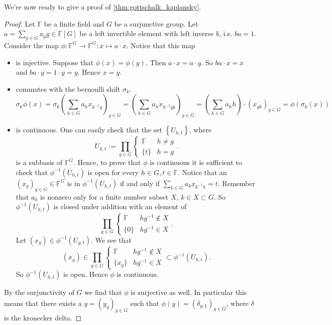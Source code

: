 \documentclass[titlepage, a4paper]{article}
\newcommand{\F}{\mathbb{F}}
\theoremstyle{remark}
\begin{document}
	We're now ready to give a proof of \cref{thm:gottschalk_kaplansky}.
	\begin{proof}
		Let $\F$ be a finite field and $G$ be a surjunctive group. 
		Let $a = \sum_{g \in G} a_g g \in \F[G]$ be a left invertible element with left inverse $b$, i.e.  $b a = 1$. 
		Consider the map $\phi: \F^{G} \to \F^{G}: x \mapsto a\cdot x$. Notice that this map 
		\begin{itemize}
			\item is injective. Suppose that $\phi(x) = \phi(y)$. Then $a\cdot x = a\cdot y$. So $ba\cdot x  = x$ and $ba \cdot y = 1\cdot y = y$. Hence $x = y$.
			\item commutes with the bernoulli shift  $\sigma_k$. 
				 \[
					 \sigma_k \phi(x) 
					 = \sigma_k\left( \sum_{h \in G} a_h x_{h^{-1}g} \right)_{g \in G} 
					 = \left( \sum_{h \in G} a_h x_{h^{-1}gk} \right)_{g \in G} 
					 = \left( \sum_{h \in G}a_h h \right) \cdot (x_{gk})_{g \in G} = \phi(\sigma_k(x)) 
				\]
			\item is continuous. 
			One can easily check that the set $\left\{ U_{h, t} \right\}$, where \[
			U_{h,t}:= \prod_{g \in G} \begin{cases}
				\F & h \ne g\\
				\{t\}& h = g
			\end{cases}
			.\] 
			is a subbasis of $\F^{G}$. 
			Hence, to prove that $\phi$ is continuous it is sufficient to check that $\phi^{-1}(U_{h, t})$ is open for every $h \in G, t\in \F$.
			Notice that an  $(x_g)_{g \in G} \in \F^{G}$ is in $\phi^{-1}(U_{h,t})$ if and only if $\sum_{k \in G} a_k x_{k^{-1}h} = t$. 
			Remember that $a_k$ is nonzero only for a finite number subset $X$,  $k\in X \subset G$. 	
			So $\phi^{-1}(U_{h, t})$ is closed under addition with an element of  \[
			\prod_{g \in G} \begin{cases}
				\F & hg^{-1}  \not\in X\\
				\{0\} & hg^{-1} \in X 
			\end{cases}
			.\] 
			Let  $(x_g) \in \phi^{-1}(U_{g,t})$. We see that  \[
				(x_g) \in \prod_{g \in G} \begin{cases}
					\F & hg^{-1} \not\in X\\
					\{x_g\} & hg^{-1} \in X
				\end{cases}
				\subset \phi^{-1}(U_{h, t})
			.\] 
			So $\phi^{-1}(U_{h,t})$ is open. Hence $\phi$ is continuous.			
		\end{itemize}
		By the surjunctivity of $G$ we find that $\phi$ is surjective as well. In particular this means that there exists a $y = (y_g)_{g \in G}$ such that $\phi(y) = (\delta_{g, 1})_{g \in G}$, where $\delta$ is the kronecker delta.

\end{proof}
\end{document}
